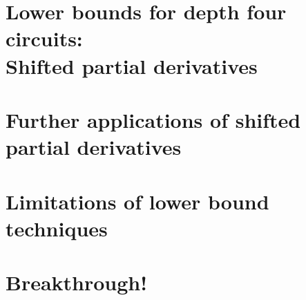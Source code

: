 




\part[Lower bounds for depth four circuits]{Lower bounds for depth four circuits:\\Shifted partial derivatives}





\part{Further applications of shifted partial derivatives}













\part{Limitations of lower bound techniques}





\part{Breakthrough!}







